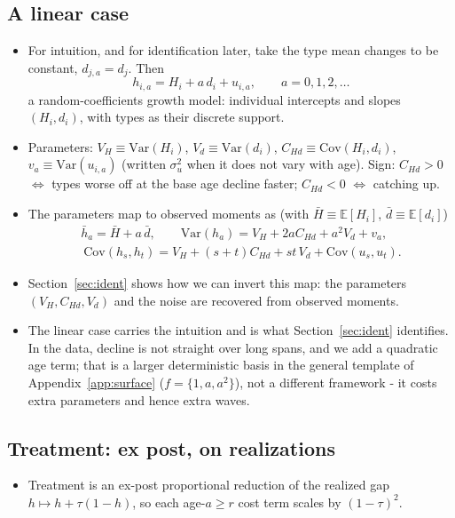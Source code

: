 \documentclass[11pt]{article}
\theoremstyle{remark}
\newcommand{\E}{\mathbb{E}}
\newcommand{\Var}{\mathrm{Var}}
\newcommand{\Cov}{\mathrm{Cov}}
\begin{document}
\subsection{A linear case}\label{sec:linear}

\begin{itemize}
\item For intuition, and for identification later, take the type mean changes to be constant, $d_{j,a}=d_j$. Then
\begin{equation}
h_{i,a}=H_i+a\,d_i+u_{i,a}, \qquad a=0,1,2,\dots
\label{eq:linwindow}
\end{equation}
a random-coefficients growth model: individual intercepts and slopes $(H_i,d_i)$, with types as their discrete support.
\item Parameters: $V_H\equiv\Var(H_i)$, $V_d\equiv\Var(d_i)$, $C_{Hd}\equiv\Cov(H_i,d_i)$, $v_a\equiv\Var(u_{i,a})$ (written $\sigma^2_u$ when it does not vary with age).
Sign: $C_{Hd}>0$ $\Leftrightarrow$ types worse off at the base age decline faster; $C_{Hd}<0$ $\Leftrightarrow$ catching up.
\item The parameters map to observed moments as (with $\bar H\equiv\E[H_i]$, $\bar d\equiv\E[d_i]$)
\begin{equation}
	\begin{gathered}
		\bar h_a=\bar H+a\,\bar d, \qquad
		\Var(h_a)=V_H+2aC_{Hd}+a^2V_d+v_a, \\\
		\Cov(h_s,h_t)=V_H+(s+t)C_{Hd}+st\,V_d+\Cov(u_s,u_t).
	\end{gathered}
\label{eq:forwardmap}
\end{equation}
\item Section~\ref{sec:ident} shows how we can invert this map: the parameters $(V_H,C_{Hd},V_d)$ and the noise are recovered from observed moments.
\item The linear case carries the intuition and is what Section~\ref{sec:ident} identifies.
In the data, decline is not straight over long spans, and we add a quadratic age term; that is a larger deterministic basis in the general template of Appendix~\ref{app:surface} ($f=\{1,a,a^2\}$), not a different framework - it costs extra parameters and hence extra waves.
\end{itemize}

\subsection{Treatment: ex post, on realizations}

\begin{itemize}
\item Treatment is an ex-post proportional reduction of the realized gap $h\mapsto h+\tau(1-h)$, so each age-$a\ge r$ cost term scales by $(1-\tau)^2$.
\end{itemize}
\end{document}
